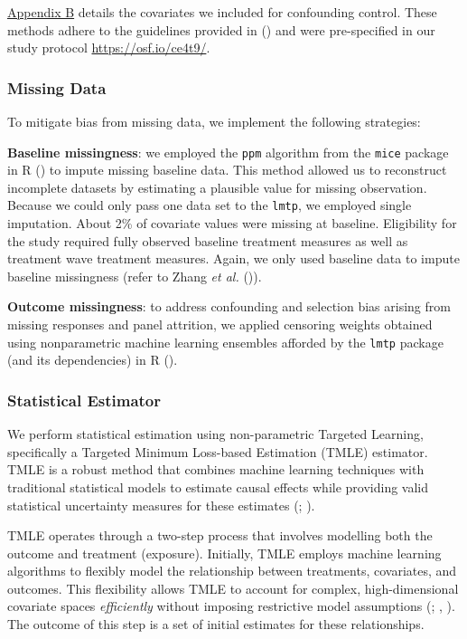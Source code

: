 \documentclass[
  single column]{article}
\begin{document}
\hyperref[appendix-demographics]{Appendix B} details the covariates we
included for confounding control. These methods adhere to the guidelines
provided in () and
were pre-specified in our study protocol \url{https://osf.io/ce4t9/}.

\subsubsection{Missing Data}\label{missing-data}

To mitigate bias from missing data, we implement the following
strategies:

\textbf{Baseline missingness}: we employed the \texttt{ppm} algorithm
from the \texttt{mice} package in R () to impute missing baseline data. This method allowed us to
reconstruct incomplete datasets by estimating a plausible value for
missing observation. Because we could only pass one data set to the
\texttt{lmtp}, we employed single imputation. About 2\% of covariate
values were missing at baseline. Eligibility for the study required
fully observed baseline treatment measures as well as treatment wave
treatment measures. Again, we only used baseline data to impute baseline
missingness (refer to Zhang \emph{et al.}
()).

\textbf{Outcome missingness}: to address confounding and selection bias
arising from missing responses and panel attrition, we applied censoring
weights obtained using nonparametric machine learning ensembles afforded
by the \texttt{lmtp} package (and its dependencies) in R
().

\subsubsection{Statistical Estimator}\label{statistical-estimator}

We perform statistical estimation using non-parametric Targeted
Learning, specifically a Targeted Minimum Loss-based Estimation (TMLE)
estimator. TMLE is a robust method that combines machine learning
techniques with traditional statistical models to estimate causal
effects while providing valid statistical uncertainty measures for these
estimates (;
).

TMLE operates through a two-step process that involves modelling both
the outcome and treatment (exposure). Initially, TMLE employs machine
learning algorithms to flexibly model the relationship between
treatments, covariates, and outcomes. This flexibility allows TMLE to
account for complex, high-dimensional covariate spaces
\emph{efficiently} without imposing restrictive model assumptions
(;
,
). The outcome of this step is a set
of initial estimates for these relationships.
\end{document}
